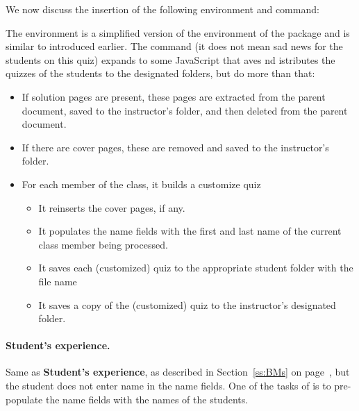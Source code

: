 \documentclass{article}
\makeatletter
\def\hisher{\@ifstar{\hisheri}{\global\advance\hesheCnt1\relax\hisheri}}
\def\hisheri{\ifodd\hesheCnt her\else his\fi}
\makeatother
\begin{document}
We now discuss the insertion of the following environment and command:
\bVerb{}%
\begin{dCmd}{\bxSize}
\begin{makeClassFiles}
\sadQuizzes
\end{makeClassFiles}
\end{dCmd}
\eVerb The  environment is a simplified version of the
 environment of the  package and is similar to
 introduced earlier. The  command (it does not
mean sad news for the students on this quiz) expands to some JavaScript that
aves nd istributes the quizzes of the
students to the designated folders, but  do more than that:
\begin{itemize}
  \item If solution pages are present, these pages are extracted from the
      parent document, saved to the instructor's folder, and then deleted from
      the parent document.
  \item If there are cover pages, these are removed and saved to the
      instructor's folder.
  \item For each member of the class, it builds a customize quiz
  \begin{itemize}
    \item It reinserts the cover pages, if any.
    \item It populates the name fields with the first and last name of the
      current class member being processed.
    \item It saves each (customized) quiz to the appropriate student folder
      with the file name 
    \item It saves a copy of the (customized) quiz to the instructor's
      designated folder.
  \end{itemize}
\end{itemize}

\paragraph*{Student's experience.} Same as \textbf{Student's experience}, as described in
Section~\ref{ss:BMs} on page~\pageref{para:basic-SE}, but the student does
not enter {\hisher} name in the name fields. One of the tasks of
 is to pre-populate the name fields with the names of the
students.
\end{document}
